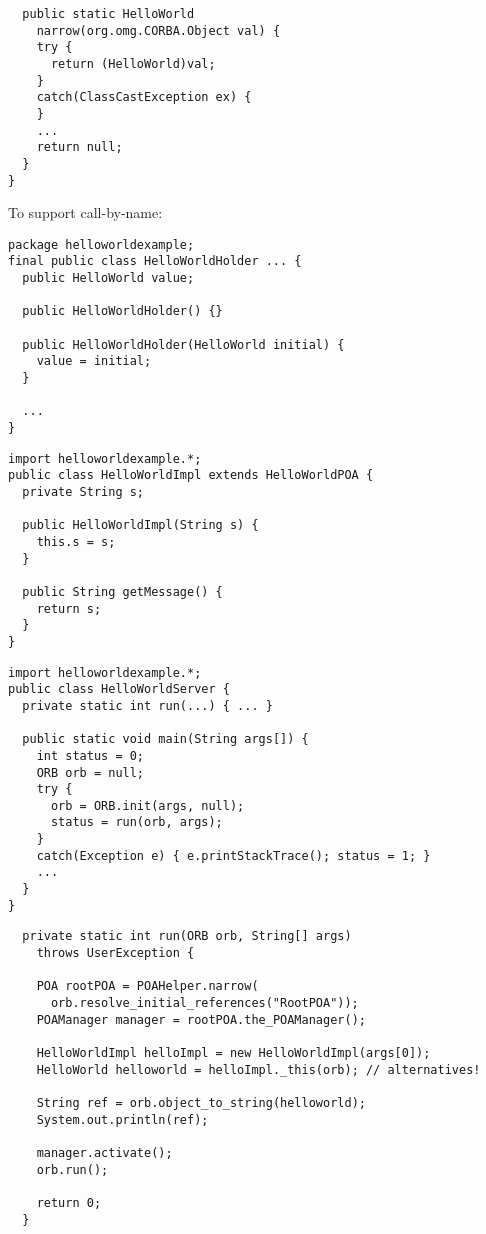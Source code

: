 \documentclass{sepslide-soa-faked} %
\begin{document}
\begin{slide}
\begin{verbatim}
  public static HelloWorld
    narrow(org.omg.CORBA.Object val) {
    try {
      return (HelloWorld)val;
    } 
    catch(ClassCastException ex) {
    }
    ...
    return null;
  }
}
\end{verbatim}
\end{slide}

\begin{slide}
To support call-by-name:
\begin{verbatim}
package helloworldexample;
final public class HelloWorldHolder ... {
  public HelloWorld value;

  public HelloWorldHolder() {}

  public HelloWorldHolder(HelloWorld initial) {
    value = initial;
  }

  ...
}
\end{verbatim}
\end{slide}

\begin{slide}
\begin{verbatim}
import helloworldexample.*;
public class HelloWorldImpl extends HelloWorldPOA {
  private String s;

  public HelloWorldImpl(String s) {
    this.s = s;
  }

  public String getMessage() {
    return s;
  }
}
\end{verbatim}
\end{slide}

\begin{slide}
\begin{verbatim}
import helloworldexample.*;
public class HelloWorldServer {
  private static int run(...) { ... }

  public static void main(String args[]) {
    int status = 0;
    ORB orb = null;
    try {
      orb = ORB.init(args, null);
      status = run(orb, args);
    }
    catch(Exception e) { e.printStackTrace(); status = 1; }
    ...
  }
}
\end{verbatim}
\end{slide}

\begin{slide}
\begin{verbatim}
  private static int run(ORB orb, String[] args)
    throws UserException {

    POA rootPOA = POAHelper.narrow(
      orb.resolve_initial_references("RootPOA"));
    POAManager manager = rootPOA.the_POAManager();

    HelloWorldImpl helloImpl = new HelloWorldImpl(args[0]);
    HelloWorld helloworld = helloImpl._this(orb); // alternatives!

    String ref = orb.object_to_string(helloworld);
    System.out.println(ref);

    manager.activate();
    orb.run();

    return 0;
  }
\end{verbatim}
\end{slide}
\end{document}
